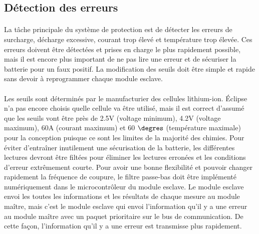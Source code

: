 
\subsection{Détection des erreurs}
	\paragraph*{}
	La tâche principale du système de protection est de détecter les erreurs de surcharge, décharge excessive, courant trop élevé et température trop élevée. Ces erreurs doivent être détectées et prises en charge le plus rapidement possible, mais il est encore plus important de ne pas lire une erreur et de sécuriser la batterie pour un faux positif. La modification des seuils doit être simple et rapide sans devoir à reprogrammer chaque module esclave. 

	\paragraph*{}
	Les seuils sont déterminés par le manufacturier des cellules lithium-ion. Éclipse n'a pas encore choisis quelle cellule va être utilisé, mais il est correct d'assumé que les seuils vont être près de 2.5V (voltage minimum), 4.2V (voltage maximum), 60A (courant maximum) et 60 $\degres$ (température maximale) pour la conception puisque ce sont les limites de la majorité des chimies. Pour éviter d'entraîner inutilement une sécurisation de la batterie, les différentes lectures devront être filtées pour éliminer les lectures erronées et les conditions d'erreur extrêmement courte. Pour avoir une bonne flexibilité et pouvoir changer rapidement la fréquence de coupure, le filtre passe-bas doit être implémenté numériquement dans le microcontrôleur du module esclave. Le module esclave envoi les toutes les informations et les résultats de chaque mesure au module maître, mais c'est le module esclave qui envoi l'information qu'il y a une erreur au module maître avec un paquet prioritaire sur le bus de communication. De cette façon, l'information qu'il y a une erreur est transmisse plus rapidement.
 